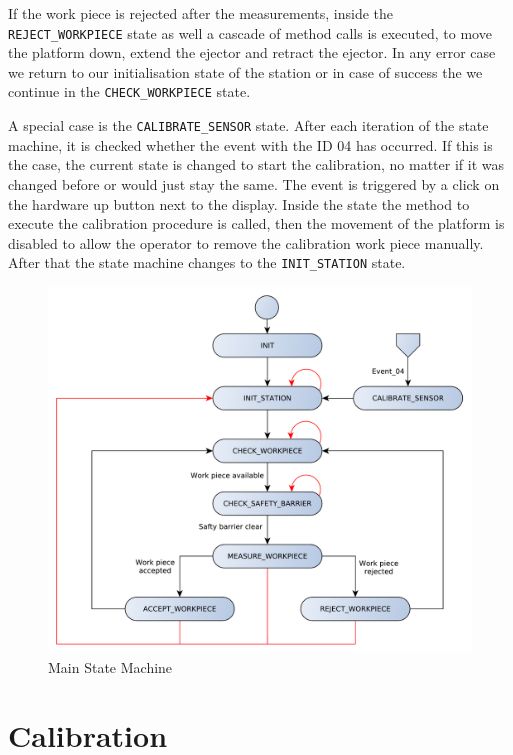 If the work piece is rejected after the measurements, inside the \texttt{REJECT\_WORKPIECE} state as well a cascade of method calls is executed, to move the platform down, extend the ejector and retract the ejector. In any error case we return to our initialisation state of the station or in case of success the we continue in the \texttt{CHECK\_WORKPIECE} state.

A special case is the \texttt{CALIBRATE\_SENSOR} state. After each iteration of the state machine, it is checked whether the event with the ID 04 has occurred. If this is the case, the current state is changed to start the calibration, no matter if it was changed before or would just stay the same. The event is triggered by a click on the hardware up  button next to the display. Inside the state the method to execute the calibration procedure is called, then the movement of the platform is disabled to allow the operator to remove the calibration work piece manually. After that the state machine changes to the \texttt{INIT\_STATION} state.

\begin{figure}[H]
	\begin{center}
		\includegraphics[scale=.60]{media/StateMachine_Main.pdf} 	
		\caption{Main State Machine}
		\label{fig:statemachine}
	\end{center}
\end{figure}

\section{Calibration} %


